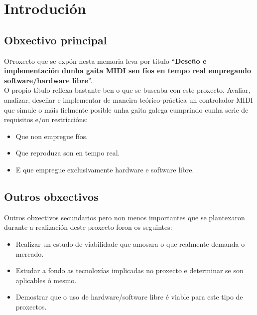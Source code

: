 \chapter{Introdución}
\minitoc
\label{chap:introduccion}


\section{Obxectivo principal}

 \lettrine{O} proxecto que se expón nesta memoria leva por título
 ``\textbf{Deseño e implementación dunha gaita MIDI sen fíos en tempo real
 empregando software/hardware libre}''. \\

 O propio título reflexa bastante ben o que se buscaba con este proxecto.
 Avaliar, analizar, deseñar e implementar de maneira teórico-práctica un 
 controlador MIDI que simule o máis fielmente posible unha gaita galega
 cumprindo cunha serie de requisitos e/ou restriccións:

 \begin{itemize}
  \item Que non empregue fíos.
  \item Que reproduza son en tempo real.
  \item E que empregue exclusivamente hardware e software libre.
 \end{itemize}

\section{Outros obxectivos}

 Outros obxectivos secundarios pero non menos importantes que se plantexaron
 durante a realización deste proxecto foron os seguintes:
 
 \begin{itemize}
  \item Realizar un estudo de viabilidade que amosara o que realmente demanda
        o mercado.
  \item Estudar a fondo as tecnoloxías implicadas no proxecto e determinar se
        son aplicables ó mesmo.
  \item Demostrar que o uso de hardware/software libre é viable para este tipo
        de proxectos.
 \end{itemize}

